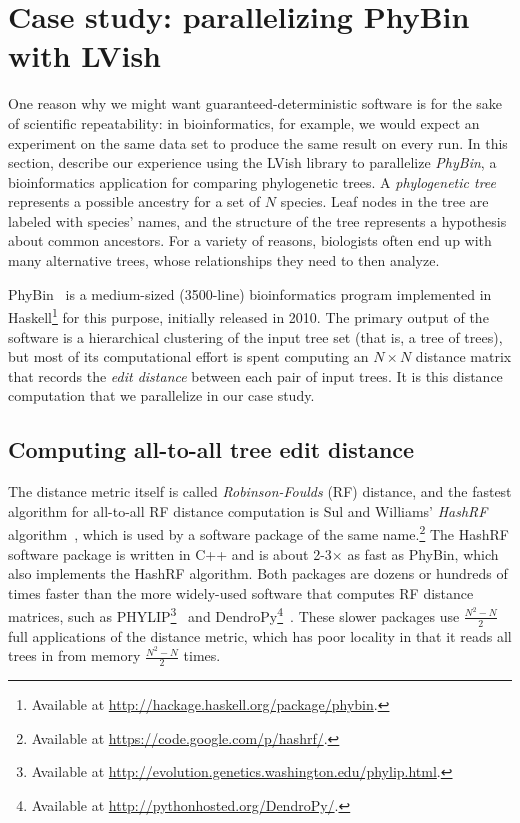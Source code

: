 \section{Case study: parallelizing PhyBin with LVish}\label{s:lvish-phybin}

One reason why we might want guaranteed-deterministic software is for
the sake of scientific repeatability: in bioinformatics, for example,
we would expect an experiment on the same data set to produce the same
result on every run.  In this section,  describe our experience using
the LVish library to parallelize \emph{PhyBin}, a bioinformatics
application for comparing phylogenetic trees.  A \emph{phylogenetic
  tree} represents a possible ancestry for a set of $N$ species.  Leaf
nodes in the tree are labeled with species' names, and the structure
of the tree represents a hypothesis about common ancestors. For a
variety of reasons, biologists often end up with many alternative
trees, whose relationships they need to then analyze.

PhyBin~\cite{PhyBin} is a medium-sized (3500-line) bioinformatics
program implemented in Haskell\footnote{Available at
  \url{http://hackage.haskell.org/package/phybin}.} for this purpose,
initially released in 2010.  The primary output of the software is a
hierarchical clustering of the input tree set (that is, a tree of
trees), but most of its computational effort is spent computing an $N
\times N$ distance matrix that records the \emph{edit distance}
between each pair of input trees.  It is this distance computation
that we parallelize in our case study.

\subsection{Computing all-to-all tree edit distance}

The distance metric itself is called \emph{Robinson-Foulds} (RF)
distance, and the fastest algorithm for all-to-all RF distance
computation is Sul and Williams' \emph{HashRF}
algorithm~, which is used by a software package of
the same name.\footnote{Available at
  \url{https://code.google.com/p/hashrf/}.}  The HashRF software
package is written in C++ and is about 2-3$\times$ as fast as PhyBin,
which also implements the HashRF algorithm.  Both packages are dozens
or hundreds of times faster than the more widely-used software that
computes RF distance matrices, such as PHYLIP\footnote{Available at
  \url{http://evolution.genetics.washington.edu/phylip.html}.}~\cite{phylip}
and DendroPy\footnote{Available at
  \url{http://pythonhosted.org/DendroPy/}.}~\cite{dendropy}.  These
slower packages use $\frac{N^2-N}{2}$ full applications of the
distance metric, which has poor locality in that it reads all trees in
from memory $\frac{N^2-N}{2}$ times.

